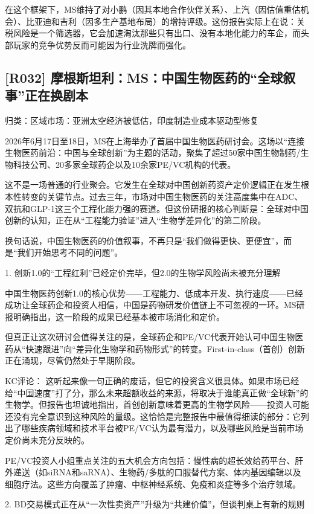 \documentclass[11pt]{ctexart}
\begin{document}
在这个框架下，MS维持了对小鹏（因其本地合作伙伴关系）、上汽（因估值重估机会）、比亚迪和吉利（因多生产基地布局）的增持评级。这份报告实际上在说：关税风险是一个筛选器，它会加速淘汰那些只有出口、没有本地化能力的车企，而头部玩家的竞争优势反而可能因为行业洗牌而强化。

\subsection{[R032] 摩根斯坦利：MS：中国生物医药的“全球叙事”正在换剧本}
{\small\color{refgray}归类：区域市场：亚洲太空经济被低估，印度制造业成本驱动型修复}

2026年6月17日至18日，MS在上海举办了首届中国生物医药研讨会。这场以“连接生物医药前沿：中国与全球创新”为主题的活动，聚集了超过50家中国生物制药/生物科技公司、20多家全球药企以及10余家PE/VC机构的代表。

这不是一场普通的行业聚会。它发生在全球对中国创新药资产定价逻辑正在发生根本性转变的关键节点。过去三年，市场对中国生物医药的关注高度集中在ADC、双抗和GLP-1这三个工程化能力强的赛道。但这份研报的核心判断是：全球对中国创新的认知，正在从“工程能力验证”进入“生物学差异化”的第二阶段。

换句话说，中国生物医药的价值叙事，不再只是“我们做得更快、更便宜”，而是“我们开始思考不同的问题”。

1. 创新1.0的“工程红利”已经定价完毕，但2.0的生物学风险尚未被充分理解

中国生物医药创新1.0的核心优势——工程能力、低成本开发、执行速度——已经成功让全球药企和投资人相信，中国是药物研发价值链上不可忽视的一环。MS研报明确指出，这一阶段的成果已经基本被市场消化和定价。

但真正让这次研讨会值得关注的是，全球药企和PE/VC代表开始认可中国生物医药从“快速跟进”向“差异化生物学和药物形式”的转变。First-in-class（首创）创新正在涌现，尽管仍然处于早期阶段。

KC评论： 这听起来像一句正确的废话，但它的投资含义很具体。如果市场已经给“中国速度”打了分，那么未来超额收益的来源，将取决于谁能真正做“全球新”的生物学。但报告也坦诚地指出，首创创新意味着更高的生物学风险——投资人可能还没有完全意识到这种风险的量级。这恰恰是完整报告中最值得细读的部分：它列出了哪些疾病领域和技术平台被PE/VC认为最有潜力，以及哪些风险是当前市场定价尚未充分反映的。

PE/VC投资人小组重点关注的五大机会方向包括：慢性病的超长效给药平台、肝外递送（如siRNA和saRNA）、生物药/多肽的口服替代方案、体内基因编辑以及细胞疗法。这些方向覆盖了肿瘤、中枢神经系统、免疫和炎症等多个治疗领域。

2. BD交易模式正在从“一次性卖资产”升级为“共建价值”，但谈判桌上有新的规则
\end{document}
